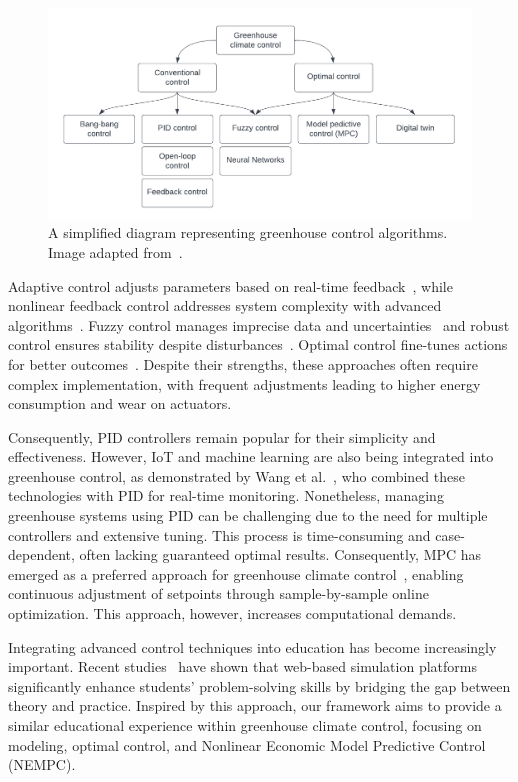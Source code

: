\documentclass[conference]{IEEEtran}
\begin{document}
\begin{figure}
    \centering
    \includegraphics[width=.5\textwidth]{images/flowchart.pdf}
    \caption{A simplified diagram representing greenhouse control algorithms. Image adapted from~\cite{Trepanier2024}.}\label{fig:flowchart}
\end{figure}

Adaptive control adjusts parameters based on real-time feedback~\cite{Tian2022}, while nonlinear feedback control addresses system complexity with advanced algorithms~\cite{Bood2023}. Fuzzy control manages imprecise data and uncertainties~\cite{smartcities7030055} and robust control ensures stability despite disturbances~\cite{Zhang2021}. Optimal control fine-tunes actions for better outcomes~\cite{Debroy2024, SVENSEN2024108578}. Despite their strengths, these approaches often require complex implementation, with frequent adjustments leading to higher energy consumption and wear on actuators.

Consequently, PID controllers remain popular for their simplicity and effectiveness. However, IoT and machine learning are also being integrated into greenhouse control, as demonstrated by Wang et al.~\cite{Wang2024}, who combined these technologies with PID for real-time monitoring. Nonetheless, managing greenhouse systems using PID can be challenging due to the need for multiple controllers and extensive tuning. This process is time-consuming and case-dependent, often lacking guaranteed optimal results.
Consequently, MPC has emerged as a preferred approach for greenhouse climate control~\cite{Hu2022}, enabling continuous adjustment of setpoints through sample-by-sample online optimization. This approach, however, increases computational demands.

Integrating advanced control techniques into education has become increasingly important. Recent studies~\cite{WangEducation2024, Zakova2024} have shown that web-based simulation platforms significantly enhance students' problem-solving skills by bridging the gap between theory and practice. Inspired by this approach, our framework aims to provide a similar educational experience within greenhouse climate control, focusing on modeling, optimal control, and Nonlinear Economic Model Predictive Control (NEMPC).
\end{document}
